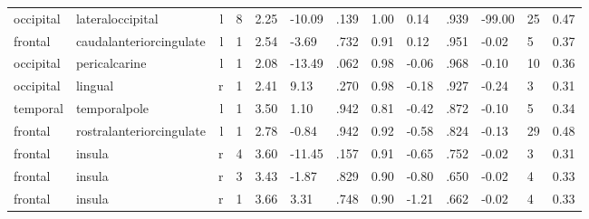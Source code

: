 \documentclass{article}
\begin{document}
\begin{longtable}{llrR{1.3cm}R{1cm}R{1.3cm}R{1cm}R{1cm}R{1.3cm}R{1cm}R{1.8cm}R{1.3cm}R{1.8cm}}
 occipital &          lateraloccipital &    l &         8 &                  2.25 &           -10.09 &               .139 &                               1.00 &                          0.14 &                            .939 & -99.00 &     25 &      0.47 \\
   frontal &   caudalanteriorcingulate &    l &         1 &                  2.54 &            -3.69 &               .732 &                               0.91 &                          0.12 &                            .951 &  -0.02 &      5 &      0.37 \\
 occipital &             pericalcarine &    l &         1 &                  2.08 &           -13.49 &               .062 &                               0.98 &                         -0.06 &                            .968 &  -0.10 &     10 &      0.36 \\
 occipital &                   lingual &    r &         1 &                  2.41 &             9.13 &               .270 &                               0.98 &                         -0.18 &                            .927 &  -0.24 &      3 &      0.31 \\
  temporal &              temporalpole &    l &         1 &                  3.50 &             1.10 &               .942 &                               0.81 &                         -0.42 &                            .872 &  -0.10 &      5 &      0.34 \\
   frontal &  rostralanteriorcingulate &    l &         1 &                  2.78 &            -0.84 &               .942 &                               0.92 &                         -0.58 &                            .824 &  -0.13 &     29 &      0.48 \\
   frontal &                    insula &    r &         4 &                  3.60 &           -11.45 &               .157 &                               0.91 &                         -0.65 &                            .752 &  -0.02 &      3 &      0.31 \\
   frontal &                    insula &    r &         3 &                  3.43 &            -1.87 &               .829 &                               0.90 &                         -0.80 &                            .650 &  -0.02 &      4 &      0.33 \\
   frontal &                    insula &    r &         1 &                  3.66 &             3.31 &               .748 &                               0.90 &                         -1.21 &                            .662 &  -0.02 &      4 &      0.33 \\

\end{longtable}
\end{document}
